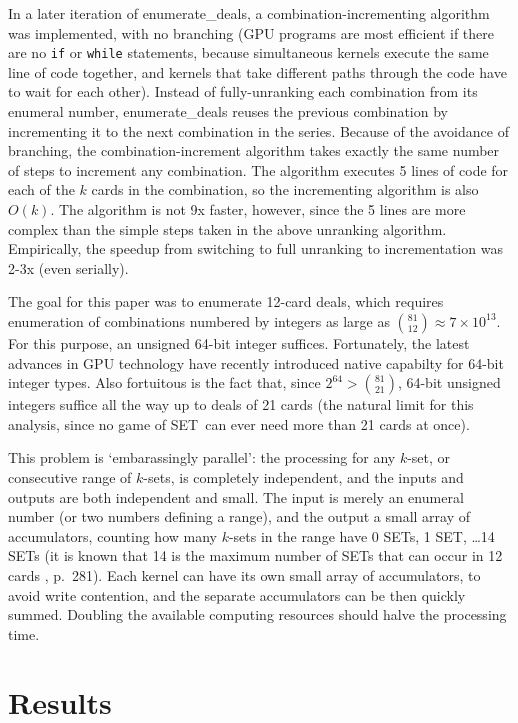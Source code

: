 \documentclass[10pt]{amsart}
\newcommand{\SETb}{SET\texttrademark\ } %
\newcommand{\ED}{{\sc enumerate\_deals}}
\newcommand{\EDb}{{\sc enumerate\_deals }}
\begin{document}
In a later iteration of \ED, a combination-incrementing algorithm was
implemented, with no branching (GPU programs are most efficient if there are no
{\tt if} or {\tt while} statements, because simultaneous kernels execute the
same line of code together, and kernels that take different paths through the
code have to wait for each other). Instead of fully-unranking each combination
from its enumeral number, \EDb reuses the previous combination by incrementing
it to the next combination in the series. Because of the avoidance of branching,
the combination-increment algorithm takes exactly the same number of steps to
increment any combination. The algorithm executes 5 lines of code for each of
the $k$ cards in the combination, so the incrementing algorithm is also
$O(k)$. The algorithm is not 9x faster, however, since the 5 lines are more
complex than the simple steps taken in the above unranking
algorithm. Empirically, the speedup from switching to full unranking to
incrementation was 2-3x (even serially).

The goal for this paper was to enumerate 12-card deals, which requires
enumeration of combinations numbered by integers as large as $\binom{81}{12}
\approx 7\times 10^{13}$. For this purpose, an unsigned 64-bit integer
suffices. Fortunately, the latest advances in GPU technology have recently
introduced native capabilty for 64-bit integer types. Also fortuitous is the
fact that, since $2^{64} > \binom{81}{21}$, 64-bit unsigned integers suffice all
the way up to deals of 21 cards (the natural limit for this analysis, since no
game of \SETb can ever need more than 21 cards at once).

This problem is `embarassingly parallel': the processing for any $k$-set, or
consecutive range of $k$-sets, is completely independent, and the inputs and
outputs are both independent and small. The input is merely an enumeral number
(or two numbers defining a range), and the output a small array of accumulators,
counting how many $k$-sets in the range have 0 SETs, 1 SET, \ldots 14 SETs (it
is known that 14 is the maximum number of SETs that can occur in 12 cards
\cite{VINCI}, \cite{JOS} p.~281). Each kernel can have its own small array of
accumulators, to avoid write contention, and the separate accumulators can be
then quickly summed. Doubling the available computing resources should halve the
processing time.

\section{Results}
\end{document}
